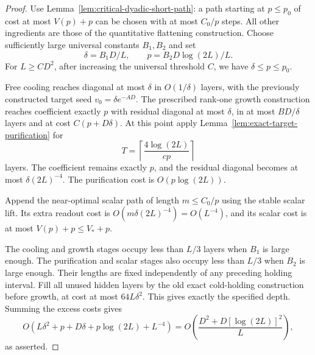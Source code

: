 \begin{proof}
Use Lemma~\ref{lem:critical-dyadic-short-path}: a path starting
at $p\le p_0$ of cost at most $V(p)+p$ can be chosen with at most
$C_0/p$ steps. All other ingredients are those of the quantitative
flattening construction. Choose sufficiently large universal constants
$B_1,B_2$ and set
\[
 \delta=B_1D/L,\qquad p=B_2D\log(2L)/L.
\]
For $L\ge CD^2$, after increasing the universal threshold $C$,
we have $\delta\le p\le p_0$.

Free cooling reaches diagonal at most $\delta$ in $O(1/\delta)$
layers, with the previously constructed target seed
$v_0=\delta e^{-AD}$. The prescribed rank-one growth construction
reaches coefficient exactly $p$ with residual diagonal at most
$\delta$, in at most $BD/\delta$ layers and at cost
$C(p+D\delta)$. At this point apply
Lemma~\ref{lem:exact-target-purification} for
\[
 T=\left\lceil\frac{4\log(2L)}{cp}\right\rceil
\]
layers. The coefficient remains exactly $p$, and the residual diagonal
becomes at most $\delta(2L)^{-4}$. The purification cost is
$O(p\log(2L))$.

Append the near-optimal scalar path of length $m\le C_0/p$ using
the stable scalar lift. Its extra readout cost is
$O(m\delta(2L)^{-4})=O(L^{-4})$, and its scalar cost is at most
$V(p)+p\le V_*+p$.

The cooling and growth stages occupy less than $L/3$ layers when
$B_1$ is large enough. The purification and scalar stages also occupy
less than $L/3$ when $B_2$ is large enough. Their lengths are fixed
independently of any preceding holding interval. Fill all unused
hidden layers by the old exact cold-holding construction before
growth, at cost at most $64L\delta^2$. This gives exactly the
specified depth. Summing the excess costs gives
\[
 O(L\delta^2+p+D\delta+p\log(2L)+L^{-4})
 =O\left(\frac{D^2+D[\log(2L)]^2}{L}\right),
\]
as asserted.
\end{proof}
